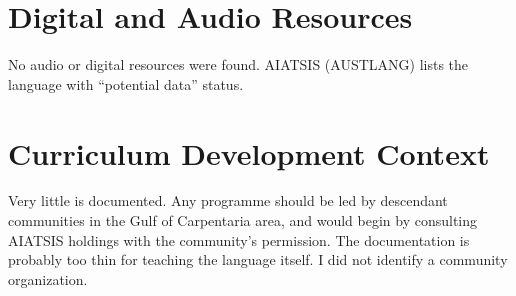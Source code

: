 \documentclass[12pt]{article}
\begin{document}
\section{Digital and Audio Resources}
No audio or digital resources were found. AIATSIS (AUSTLANG) lists the language with ``potential data'' status.

\section{Curriculum Development Context}
Very little is documented. Any programme should be led by descendant communities in the Gulf of Carpentaria area, and would begin by consulting AIATSIS holdings with the community's permission. The documentation is probably too thin for teaching the language itself. I did not identify a community organization.
\end{document}

